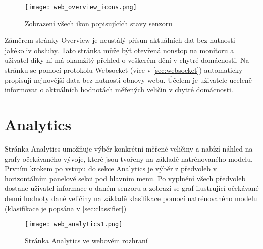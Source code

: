 \begin{figure}[H]
  \centering
  \texttt{[image: web\_overview\_icons.png]}
  \caption{Zobrazení všech ikon popisujících stavy senzoru}
  \label{fig:web_overview_icons}
\end{figure}

Záměrem stránky Overview je neustálý přísun aktuálních dat bez nutnosti jakékoliv obsluhy. Tato stránka může být otevřená nonstop na monitoru a uživatel díky ní má okamžitý přehled o veškerém dění v chytré domácnosti. Na stránku se pomocí protokolu Websocket (více v \cref{sec:websocket}) automaticky propisují nejnovější data bez nutnosti obnovy webu. Účelem je uživatele uceleně informovat o aktuálních hodnotách měřených veličin v chytré domácnosti.

\section{Analytics} \label{sec:analytics}

Stránka Analytics umožňuje výběr konkrétní měřené veličiny a nabízí náhled na grafy očekávaného vývoje, které jsou tvořeny na základě natrénovaného modelu. Prvním krokem po vstupu do sekce Analytics je výběr z předvoleb v horizontálním panelové sekci pod hlavním menu. Po vyplnění všech předvoleb dostane uživatel informace o daném senzoru a zobrazí se graf ilustrující očekávané denní hodnoty dané veličiny na základě klasifikace pomocí natrénovaného modelu (klasifikace je popsána v \cref{sec:classifier})

\begin{figure}[H]
  \centering
  \texttt{[image: web\_analytics1.png]}
  \caption{Stránka Analytics ve webovém rozhraní}
  \label{fig:web_analytics1}
\end{figure}

